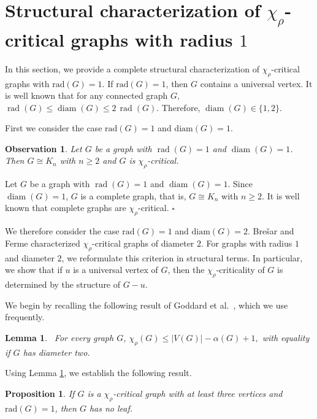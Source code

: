 \documentclass[12pt]{article}
\newtheorem{lemma}[theorem]{Lemma}
\newtheorem{proposition}[theorem]{Proposition}
\newtheorem{observation}[theorem]{Observation}
\newcommand{\proof}{\noindent{\bf Proof.\ }}
\newcommand{\qed}{\hfill $\square$ \bigskip}
\newcommand{\ie}{that is}
\begin{document}
\section{Structural characterization of $\chi_{\rho}$-critical graphs with radius $1$}
\label{sec:rad1}

In this section, we provide a complete structural characterization of \( \chi_\rho \)-critical graphs with \( \mathrm{rad}(G) = 1 \). If \( \mathrm{rad}(G) = 1 \), then $G$ contains a universal vertex. It is well known that for any connected graph $G$,
$\operatorname{rad}(G) \le \operatorname{diam}(G) \le 2\,\operatorname{rad}(G)$. Therefore, $\operatorname{diam}(G) \in \{1,2\}$.

First we consider the case \( \mathrm{rad}(G) = 1 \) and \( \mathrm{diam}(G) = 1 \).

\begin{observation}\label{obs:complete}
Let $G$ be a graph with $\operatorname{rad}(G)=1$ and $\operatorname{diam}(G)=1$. 
Then $G \cong K_n$ with $n \ge 2$  and $G$ is $\chi_\rho$-critical.
\end{observation}

\proof
Let $G$ be a graph with $\operatorname{rad}(G)=1$ and $\operatorname{diam}(G)=1$. Since $\operatorname{diam}(G)=1$, $G$ is a complete graph, \ie, $G \cong K_n$ with $n \ge 2$. 
It is well known that complete graphs are $\chi_\rho$-critical.
\qed

We therefore consider the case $\mathrm{rad}(G) = 1$ and $\mathrm{diam}(G) = 2$. Bre\v{s}ar and Ferme \cite{bresar-2022} characterized $\chi_\rho$-critical graphs of diameter $2$. For graphs with radius $1$ and diameter $2$, we reformulate this criterion in structural terms. In particular, we show that if $u$ is a universal vertex of $G$, then the $\chi_\rho$-criticality of $G$ is determined by the structure of $G-u$. 

We begin by recalling the following result of Goddard et al.~\cite{goddard-2008}, which we use frequently.

\begin{lemma}~{\rm \cite{goddard-2008}}\label{lemma4}
For every graph $G$, $\chi_\rho(G) \leq |V(G)|-\alpha(G)+1,$ with equality if $G$ has diameter two.
\end{lemma}

Using Lemma \ref{lemma4}, we establish the following result.

\begin{proposition}\label{pro14}
If $G$ is a $\chi_\rho$-critical graph with at least three vertices and $\mathrm{rad}(G) = 1$, then $G$ has no leaf.
\end{proposition}
\end{document}
